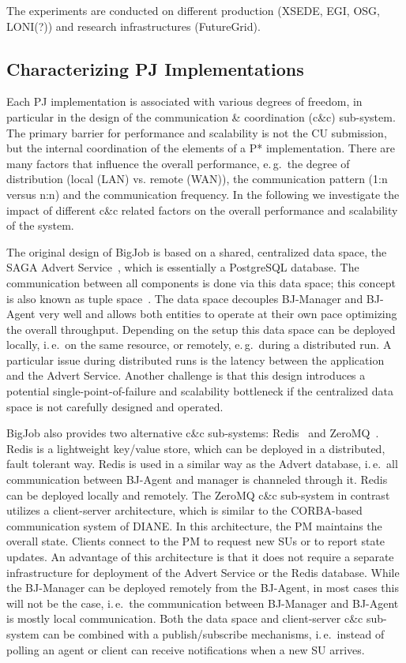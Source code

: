\documentclass[conference,final]{IEEEtran}
\newcommand{\cu}{CU\xspace}
\newcommand{\upp}{\vspace*{-0.5em}}
\begin{document}
The experiments are conducted on different production (XSEDE, EGI,
OSG, LONI(?)) and research infrastructures (FutureGrid).

\subsection{Characterizing PJ Implementations\upp\upp}
\label{sec:pj_performance}
Each PJ implementation is associated with various degrees of freedom,
in particular in the design of the communication \& coordination
(c\&c) sub-system.  The primary barrier for performance and
scalability is not the \cu  submission, but the internal coordination of
the elements of a P* implementation. There are many factors that
influence the overall performance, e.\,g.\ the degree of distribution
(local (LAN) vs. remote (WAN)), the communication pattern (1:n versus
n:n) and the communication frequency. In the following we investigate
the impact of different c\&c related factors on the overall
performance and scalability of the system.

The original design of BigJob is based on a shared, centralized data
space, the SAGA Advert Service~\cite{saga_advert}, which is
essentially a PostgreSQL database. The communication between all
components is done via this data space; this concept is also known as
tuple space~\cite{Gelernter:1985:GCL:2363.2433}.  The data space
decouples BJ-Manager and BJ-Agent very well and allows both entities
to operate at their own pace optimizing the overall throughput.
Depending on the setup this data space can be deployed locally,
i.\,e.\ on the same resource, or remotely, e.\,g.\ during a
distributed run. A particular issue during distributed runs is the
latency between the application and the Advert Service. Another
challenge is that this design introduces a potential
single-point-of-failure and scalability bottleneck if the centralized
data space is not carefully designed and operated.


BigJob also provides two alternative c\&c sub-systems:
Redis~\cite{redis} and ZeroMQ~\cite{zmq}. Redis is a lightweight
key/value store, which can be deployed in a distributed, fault
tolerant way. Redis is used in a similar way as the Advert database,
i.\,e.\ all communication between BJ-Agent and manager is channeled
through it. Redis can be deployed locally and remotely.  The ZeroMQ
c\&c sub-system in contrast utilizes a client-server architecture,
which is similar to the CORBA-based~\cite{OMG-CORBA303:2004}
communication system of DIANE. In this architecture, the PM maintains
the overall state. Clients connect to the PM to request new SUs or to
report state updates. An advantage of this architecture is that it
does not require a separate infrastructure for deployment of the
Advert Service or the Redis database. While the BJ-Manager can be
deployed remotely from the BJ-Agent, in most cases this will not be
the case, i.\,e.\ the communication between BJ-Manager and BJ-Agent is
mostly local communication. Both the data space and client-server c\&c
sub-system can be combined with a publish/subscribe mechanisms,
i.\,e.\ instead of polling an agent or client can receive
notifications when a new SU arrives. 
\end{document}
